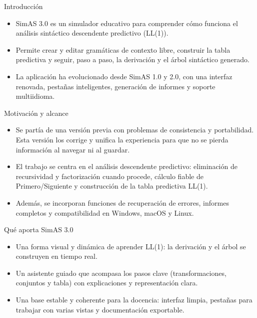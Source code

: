 \begin{frame}{Introducción}
  \begin{itemize}
    \item SimAS 3.0 es un simulador educativo para comprender cómo funciona el análisis sintáctico descendente predictivo (LL(1)).
    \item Permite crear y editar gramáticas de contexto libre, construir la tabla predictiva y seguir, paso a paso, la derivación y el árbol sintáctico generado.
    \item La aplicación ha evolucionado desde SimAS 1.0 y 2.0, con una interfaz renovada, pestañas inteligentes, generación de informes y soporte multiidioma.
  \end{itemize}
\end{frame}

\begin{frame}{Motivación y alcance}
  \begin{itemize}
    \item Se partía de una versión previa con problemas de consistencia y portabilidad. Esta versión los corrige y unifica la experiencia para que no se pierda información al navegar ni al guardar.
    \item El trabajo se centra en el análisis descendente predictivo: eliminación de recursividad y factorización cuando procede, cálculo fiable de Primero/Siguiente y construcción de la tabla predictiva LL(1).
    \item Además, se incorporan funciones de recuperación de errores, informes completos y compatibilidad en Windows, macOS y Linux.
  \end{itemize}
\end{frame}

\begin{frame}{Qué aporta SimAS 3.0}
  \begin{itemize}
    \item Una forma visual y dinámica de aprender LL(1): la derivación y el árbol se construyen en tiempo real.
    \item Un asistente guiado que acompasa los pasos clave (transformaciones, conjuntos y tabla) con explicaciones y representación clara.
    \item Una base estable y coherente para la docencia: interfaz limpia, pestañas para trabajar con varias vistas y documentación exportable.
  \end{itemize}
\end{frame}



